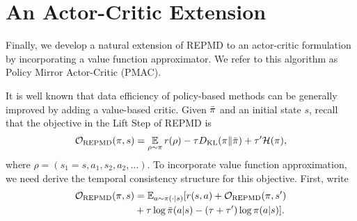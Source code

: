 


\section{An Actor-Critic Extension}
\label{subsec:repmd_value}



Finally, we develop a natural extension of REPMD to an actor-critic
formulation by incorporating a value function approximator.
We refer to this algorithm as Policy Mirror Actor-Critic (PMAC). 

It is well known that data efficiency of policy-based methods 
can be generally improved by adding a value-based critic.
Given $\bar{\pi}$ and an initial state $s$,
recall that the objective in the Lift Step of REPMD is
{\small
\begin{equation*}
	{\mathcal{O}}_{\text{REPMD}}(\pi, s) =   \operatorname*{\mathbb{E}}\limits_{\rho \sim \pi}{  r(\rho)  - \tau D_{\mathrm{KL}}(\pi \| \bar{\pi}) + \tau^{\prime} \mathcal{H}(\pi)},
\end{equation*}
}
where $\rho=  (s_1 = s, a_1, s_2, a_2, \ldots)$.
To incorporate value function approximation, we need derive 
the temporal consistency structure for this objective.
First, write
{\small
\begin{equation*}
\begin{split}
 {\mathcal{O}}_{\text{REPMD}}(\pi, s) &= \mathbb{E}_{a\sim \pi(\cdot \vert s)} [ r(s,a) + {\mathcal{O}}_{\text{REPMD}}(\pi, s') \\
 &+ \tau \log \bar{\pi}(a|s) - \left(\tau+ \tau' \right) \log \pi(a|s) ].
\end{split}
\end{equation*}
}

